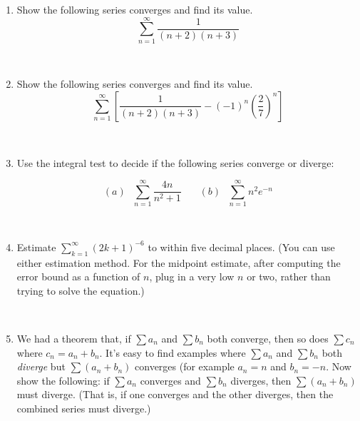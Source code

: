 \documentclass[11pt, oneside]{article}   	%
\title{}
\author{Week 10 discussion problems}
\date{}							%
\begin{document}
\maketitle

\begin{enumerate}

\item Show the following series converges and find its value.
 $$\sum_{n=1}^{\infty} \dfrac{1}{(n+2)(n+3)}$$

\

\item Show the following series converges and find its value.
 $$\sum_{n=1}^{\infty} \left[ \dfrac{1}{(n+2)(n+3)} - (-1)^n \left(\dfrac{2}{7} \right)^n  \right]$$

\

\item Use the integral test to decide if the following series converge or diverge:
 
$$(a) \ \ \ \sum_{n=1}^{\infty} \dfrac{4n}{n^2+1} \ \ \ \ \ \ \ \  (b) \ \ \ \sum_{n=1}^{\infty} n^2 e^{-n} $$

\

\item Estimate $\sum_{k=1}^{\infty} (2k+1)^{-6}$ to within five decimal places. (You can use either estimation method. For the midpoint estimate, after computing the error bound as a function of $n$, plug in a very low $n$ or two, rather than trying to solve the equation.) 

\


 
\item We had a theorem that, if $\sum a_n$ and $\sum b_n$ both converge, then so does $\sum c_n$ where $c_n=a_n+b_n$.  It's easy to find examples where $\sum a_n$ and $\sum b_n$ both \emph{diverge} but 
$\sum (a_n+b_n)$ converges (for example $a_n=n$ and $b_n=-n$. Now show the following: if  $\sum a_n$ converges and $\sum b_n$ diverges, then $\sum (a_n + b_n)$ must diverge. (That is, if one converges and the other diverges, then the combined series must diverge.)

\


 
 \end{enumerate}
\end{document}
